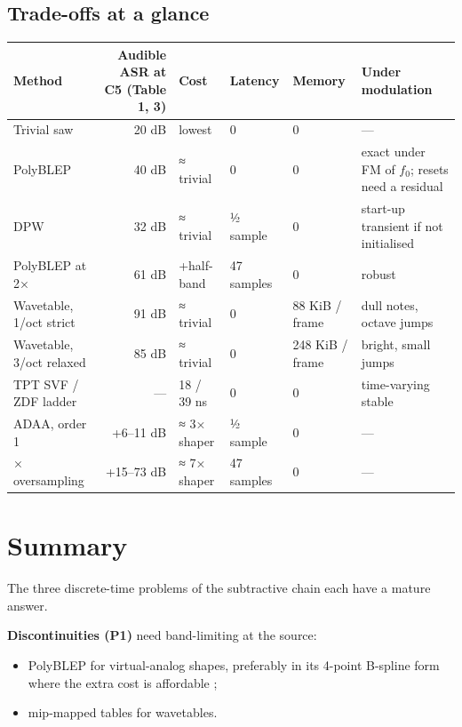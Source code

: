 \documentclass[conference]{IEEEtran}
\begin{document}
\subsection{Trade-offs at a glance}
\begin{table}[t]
\centering\footnotesize
\begin{tabularx}{\textwidth}{@{}>{\raggedright\arraybackslash}Xrlll>{\raggedright\arraybackslash}X@{}}
\toprule
\textbf{Method} & \textbf{Audible ASR at C5 (Table 1, 3)} & \textbf{Cost} & \textbf{Latency} & \textbf{Memory} & \textbf{Under modulation} \\
\midrule
Trivial saw & 20 dB & lowest & 0 & 0 & — \\
PolyBLEP & 40 dB & ≈ trivial & 0 & 0 & exact under FM of $f_0$; resets need a residual \\
DPW & 32 dB & ≈ trivial & ½ sample & 0 & start-up transient if not initialised \\
PolyBLEP at 2× & 61 dB & +half-band & 47 samples & 0 & robust \\
Wavetable, 1/oct strict & 91 dB & ≈ trivial & 0 & 88 KiB / frame & dull notes, octave jumps \\
Wavetable, 3/oct relaxed & 85 dB & ≈ trivial & 0 & 248 KiB / frame & bright, small jumps \\
TPT SVF / ZDF ladder & — & 18 / 39 ns & 0 & 0 & time-varying stable \cite{r41} \\
ADAA, order 1 & +6–11 dB & ≈ 3× shaper & ½ sample & 0 & — \\
2× oversampling & +15–73 dB & ≈ 7× shaper & 47 samples & 0 & — \\
\bottomrule
\end{tabularx}
\end{table}

\setcounter{section}{4}
\section{Summary}
The three discrete-time problems of the subtractive chain each have a mature answer.

\textbf{Discontinuities (P1)} need band-limiting at the source:

\begin{itemize}
\item PolyBLEP for virtual-analog shapes, preferably in its 4-point B-spline form where the extra cost is affordable \cite{r40};
\item mip-mapped tables for wavetables.
\end{itemize}
\end{document}
